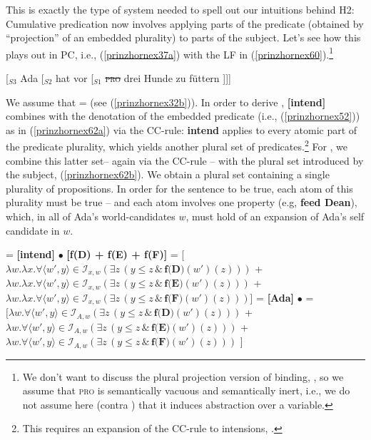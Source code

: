 \documentclass[output=paper,colorlinks,citecolor=brown,
]{langscibook}
\begin{document}
This is exactly the type of system needed to spell out our intuitions behind H2: Cumulative predication now involves applying parts of the predicate (obtained by “projection” of an embedded plurality) to parts of the subject. Let's see how this plays out in PC, i.e., (\ref{prinzhornex37a}) with the LF in (\ref{prinzhornex60}).\footnote{We don't want to discuss the  plural projection version of binding, \citep{Haslinger:2020d}, so we assume that \textsc{pro} is semantically vacuous and semantically inert, i.e., we do not assume here (contra \citealt{Heim:1998}) that it induces abstraction over a variable.} 

\ea  \label{prinzhornex60} [$_{S3}$ Ada [$_{S2}$ hat vor [$_{S1}$ \sout{\textsc{pro}} drei Hunde zu füttern ]]]  \z

We assume that  =  (see (\ref{prinzhornex32b})). In order to derive ,  \textbf{[intend]} combines with the denotation of the embedded predicate (i.e., (\ref{prinzhornex52})) as in (\ref{prinzhornex62a}) via the CC-rule: \textbf{intend} applies to every atomic part of the predicate plurality, which yields another plural set of predicates.\footnote{This requires an expansion of the CC-rule to  intensions, \citep{Schmitt:2019a}.} For , we combine this latter set-- again via the CC-rule -- with the plural set introduced by the subject, (\ref{prinzhornex62b}). We obtain a plural set containing a single plurality of propositions. In order for the sentence to be true, each atom of this plurality must be true -- and each atom involves one property (e.g, {\bf feed Dean}), which, in all of Ada's world-candidates $w$, must hold of an expansion of Ada's self candidate in $w$.

\ea
\ea  {} = \textbf{[intend]} $\bullet$ \textbf{[f(D) + f(E) + f(F)]} = 
 [$\lambda w. \lambda x. \forall \langle w' ,y\rangle \in \mathcal{I}_{x,w} (\exists  z \,(y \le z\, \& \,\textbf{f(D)}(w')(z)))$ +
 $\lambda w. \lambda x. \forall \langle w' ,y\rangle \in \mathcal{I}_{x,w} (\exists  z \,(y \le z\, \& \,\textbf{f(E)}(w')(z)))$ +
 $\lambda w. \lambda x. \forall \langle w' ,y \rangle \in \mathcal{I}_{x,w} (\exists  z \,(y \le z\, \& \,\textbf{f(F)}(w')(z)))$]
\label{prinzhornex62a}
\ex {} = \textbf{[Ada]} $\bullet$  = \\
 $[\lambda w.  \forall \langle w' ,y \rangle \in \mathcal{I}_{A,w} (\exists  z \,(y \le z\, \& \,\textbf{f(D)}(w')(z)))$ +
 $\lambda w.  \forall \langle w' ,y\rangle \in \mathcal{I}_{A,w} (\exists  z \,(y \le z\, \& \,\textbf{f(E)}(w')(z)))$ +
 $\lambda w.  \forall \langle w' ,y \rangle \in \mathcal{I}_{A,w} (\exists  z \,(y \le z\, \& \,\textbf{f(F)}(w')(z)))$ ]
\label{prinzhornex62b}
\z\z
\end{document}
